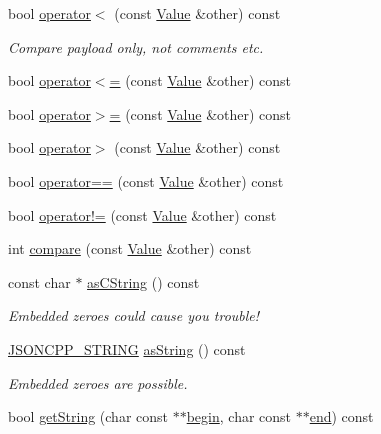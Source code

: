 \begin{DoxyCompactItemize}
\item 
bool \hyperlink{class_json_1_1_value_aac6bd14155b88ed2d39ef54820b39e49}{operator$<$} (const \hyperlink{class_json_1_1_value}{Value} \&other) const
\begin{DoxyCompactList}\small\item\em Compare payload only, not comments etc. \end{DoxyCompactList}\item 
bool \hyperlink{class_json_1_1_value_a40c411a320a416d5eac0052b36211286}{operator$<$=} (const \hyperlink{class_json_1_1_value}{Value} \&other) const
\item 
bool \hyperlink{class_json_1_1_value_afe2c3e52df60b9622cbd8358b74bdbf5}{operator$>$=} (const \hyperlink{class_json_1_1_value}{Value} \&other) const
\item 
bool \hyperlink{class_json_1_1_value_a4646c2f0764908c0972160c7c2ebe567}{operator$>$} (const \hyperlink{class_json_1_1_value}{Value} \&other) const
\item 
bool \hyperlink{class_json_1_1_value_a16f9250e30d5c4505cd11137c564a764}{operator==} (const \hyperlink{class_json_1_1_value}{Value} \&other) const
\item 
bool \hyperlink{class_json_1_1_value_a86e95be072e515c48abc61dec63a1689}{operator!=} (const \hyperlink{class_json_1_1_value}{Value} \&other) const
\item 
int \hyperlink{class_json_1_1_value_aefa4464ca1bb0bcc9a87b38ed62ca2e0}{compare} (const \hyperlink{class_json_1_1_value}{Value} \&other) const
\item 
const char $\ast$ \hyperlink{class_json_1_1_value_a16668c8db7ef0a5de040012f0dfd84b0}{as\+C\+String} () const
\begin{DoxyCompactList}\small\item\em Embedded zeroes could cause you trouble! \end{DoxyCompactList}\item 
\hyperlink{config_8h_a1e723f95759de062585bc4a8fd3fa4be}{J\+S\+O\+N\+C\+P\+P\+\_\+\+S\+T\+R\+I\+NG} \hyperlink{class_json_1_1_value_ae3f9b0d38f820ccdd8888aa92ea6e792}{as\+String} () const
\begin{DoxyCompactList}\small\item\em Embedded zeroes are possible. \end{DoxyCompactList}\item 
bool \hyperlink{class_json_1_1_value_a2e1b7be6bde2fe23f15290d9ddbbdf8a}{get\+String} (char const $\ast$$\ast$\hyperlink{class_json_1_1_value_a015459a3950c198d63a2d3be8f5ae296}{begin}, char const $\ast$$\ast$\hyperlink{class_json_1_1_value_a3e443cd0ef24f7e028b175e47ee045e0}{end}) const

\end{DoxyCompactItemize}
